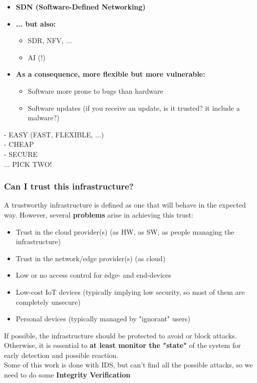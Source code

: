 \begin{itemize}[itemsep=0pt]
    \item \textbf{SDN (Software-Defined Networking)}
    \item \textbf{... but also:}
    \begin{itemize}[itemsep=0pt]
        \item SDR, NFV, ...
        \item AI (!)
    \end{itemize}
    \item \textbf{As a consequence, more flexible but more vulnerable:}
    \begin{itemize}[itemsep=0pt]
        \item Software more prone to bugs than hardware
        \item Software updates (if you receive an update, is it trusted? it include a malware?)
    \end{itemize}
\end{itemize}

\begin{boxH}
- EASY (FAST, FLEXIBLE, ...) \\
- CHEAP \\
- SECURE \\
... PICK TWO!
\end{boxH}

\subsubsection{Can I trust this infrastructure?}
A trustworthy infrastructure is defined as one that will behave in the expected way. However, several \textbf{problems} arise in achieving this trust:

\begin{itemize}[itemsep=0pt]
    \item Trust in the cloud provider(s) (as HW, as SW, as people managing the infrastructure)
    \item Trust in the network/edge provider(s) (as cloud)
    \item Low or no access control for edge- and end-devices
    \item Low-cost IoT devices (typically implying low security, so most of them are completely unsecure) 
    \item Personal devices (typically managed by "ignorant" users)
\end{itemize}

If possible, the infrastructure should be protected to avoid or block attacks. Otherwise, it is essential to \textbf{at least monitor the "state"} of the system for early detection and possible reaction.\\ Some of this work is done with IDS, but can't find all the possible attacks, so we need to do some \textbf{Integrity Verification}

